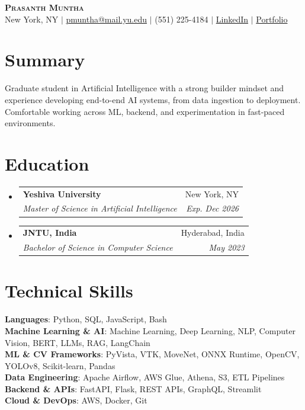 \documentclass[letterpaper,11pt]{article}
\makeatletter
\newcommand{\resumeSubheading}[4]{
  \item
  \begin{tabular*}{0.97\textwidth}{l@{\extracolsep{\fill}}r}
    \textbf{#1} & #2 \\
    \textit{\small#3} & \textit{\small #4} \\
  \end{tabular*}
}
\newcommand{\resumeSubHeadingListStart}{\begin{itemize}[leftmargin=0.15in, label={}]}
\newcommand{\resumeSubHeadingListEnd}{\end{itemize}}
\makeatother
\begin{document}
\begin{center}
    \textbf{\Huge \scshape Prasanth Muntha} \\ \vspace{2pt}
    \small New York, NY $|$
    \href{mailto:pmuntha@mail.yu.edu}{pmuntha@mail.yu.edu} $|$
    (551) 225-4184 $|$
    \href{https://www.linkedin.com/in/prasanth-muntha-30b96623b/}{LinkedIn} $|$
    \href{https://prsanthx.github.io/}{Portfolio}
\end{center}

\section{Summary}
\small{
Graduate student in Artificial Intelligence with a strong builder mindset and experience developing end-to-end AI systems, from data ingestion to deployment. Comfortable working across ML, backend, and experimentation in fast-paced environments.
}

\section{Education}
\resumeSubHeadingListStart
  \resumeSubheading{Yeshiva University}{New York, NY}{Master of Science in Artificial Intelligence}{Exp. Dec 2026}
  \resumeSubheading{JNTU, India}{Hyderabad, India}{Bachelor of Science in Computer Science}{May 2023}
\resumeSubHeadingListEnd

\section{Technical Skills}
\begin{itemize}[leftmargin=0.15in, label={}, itemsep=1pt]
\small{\item{
\textbf{Languages}: Python, SQL, JavaScript, Bash \\
\textbf{Machine Learning \& AI}: Machine Learning, Deep Learning, NLP, Computer Vision, BERT, LLMs, RAG, LangChain \\
\textbf{ML \& CV Frameworks}: PyVista, VTK, MoveNet, ONNX Runtime, OpenCV, YOLOv8, Scikit-learn, Pandas \\
\textbf{Data Engineering}: Apache Airflow, AWS Glue, Athena, S3, ETL Pipelines \\
\textbf{Backend \& APIs}: FastAPI, Flask, REST APIs, GraphQL, Streamlit \\
\textbf{Cloud \& DevOps}: AWS, Docker, Git
}}
\end{itemize}
\end{document}

